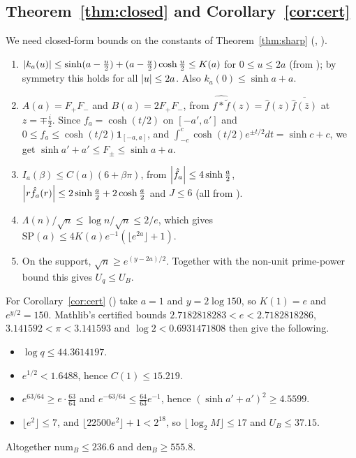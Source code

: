 \subsection{Theorem~\ref{thm:closed} and Corollary~\ref{cor:cert}}
We need closed-form bounds on the constants of Theorem~\ref{thm:sharp} (,
).
\begin{enumerate}
\item $\left\lvert k_a(u) \right\rvert\le\sinh(a-\frac u2)+(a-\frac u2)\cosh\frac u2\le K(a)$ for $0\le u\le2a$ (from \cite{grhmiller}); by symmetry
  this holds for all $\left\lvert u \right\rvert\le2a$. Also $k_a(0)\le\sinh a+a$.
\item $A(a)=F_+F_-$ and $B(a)=2F_+F_-$, from $\widehat{f*\tilde f}(z)=\hat f(z)\overline{\hat f(\bar z)}$ at $z=\mp\frac i2$.
  Since $f_a=\cosh(t/2)$ on $[-a',a']$ and $0\le f_a\le\cosh(t/2)\mathbf 1_{[-a,a]}$, and
  $\int_{-c}^c\cosh(t/2)e^{\pm t/2}dt=\sinh c+c$, we get $\sinh a'+a'\le F_\pm\le\sinh a+a$.
\item $I_a(\beta)\le C(a)(6+\beta\pi)$, from $\left\lvert \hat f_a \right\rvert\le4\sinh\frac a2$, $\left\lvert r\hat f_a(r) \right\rvert\le2\sinh\frac a2+2\cosh\frac a2$
  and $J\le6$ (all from \cite{grhmiller}).
\item $\Lambda(n)/\sqrt n\le\log n/\sqrt n\le2/e$, which gives $\mathrm{SP}(a)\le4K(a)e^{-1}(\lfloor e^{2a}\rfloor+1)$.
\item On the support, $\sqrt n\ge e^{(y-2a)/2}$. Together with the non-unit prime-power bound this gives $U_q\le U_B$.
\end{enumerate}
For Corollary~\ref{cor:cert} () take $a=1$ and $y=2\log150$, so $K(1)=e$ and
$e^{y/2}=150$. Mathlib's certified bounds $2.7182818283<e<2.7182818286$, $3.141592<\pi<3.141593$ and
$\log2<0.6931471808$ then give the following.
\begin{itemize}
\item $\log q\le44.3614197$.
\item $e^{1/2}<1.6488$, hence $C(1)\le15.219$.
\item $e^{63/64}\ge e\cdot\frac{63}{64}$ and $e^{-63/64}\le\frac{64}{63}e^{-1}$, hence $(\sinh a'+a')^2\ge4.5599$.
\item $\lfloor e^2\rfloor\le7$, and $\lfloor22500e^2\rfloor+1<2^{18}$, so $\lfloor\log_2M\rfloor\le17$ and $U_B\le37.15$.
\end{itemize}
Altogether $\mathrm{num}_B\le236.6$ and $\mathrm{den}_B\ge555.8$.
